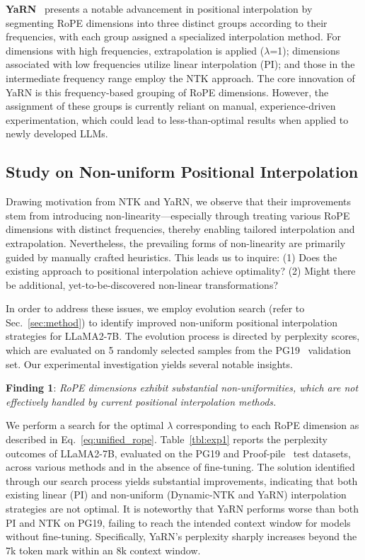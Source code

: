 \textbf{YaRN}~\cite{yarn} presents a notable advancement in positional interpolation by segmenting RoPE dimensions into three distinct groups according to their frequencies, with each group assigned a specialized interpolation method. For dimensions with high frequencies, extrapolation is applied ($\lambda$=1); dimensions associated with low frequencies utilize linear interpolation (PI); and those in the intermediate frequency range employ the NTK approach. The core innovation of YaRN is this frequency-based grouping of RoPE dimensions. However, the assignment of these groups is currently reliant on manual, experience-driven experimentation, which could lead to less-than-optimal results when applied to newly developed LLMs.

\subsection{Study on Non-uniform Positional Interpolation}

Drawing motivation from NTK and YaRN, we observe that their improvements stem from introducing non-linearity—especially through treating various RoPE dimensions with distinct frequencies, thereby enabling tailored interpolation and extrapolation. Nevertheless, the prevailing forms of non-linearity are primarily guided by manually crafted heuristics. This leads us to inquire: (1) Does the existing approach to positional interpolation achieve optimality? (2) Might there be additional, yet-to-be-discovered non-linear transformations?

In order to address these issues, we employ evolution search (refer to Sec.~\ref{sec:method}) to identify improved non-uniform positional interpolation strategies for LLaMA2-7B. The evolution process is directed by perplexity scores, which are evaluated on 5 randomly selected samples from the PG19~\cite{pg19} validation set. Our experimental investigation yields several notable insights.

\textbf{Finding 1}: \textit{RoPE dimensions exhibit substantial non-uniformities, which are not effectively handled by current positional interpolation methods.}

We perform a search for the optimal $\lambda$ corresponding to each RoPE dimension as described in Eq.~\ref{eq:unified_rope}. Table~\ref{tbl:exp1} reports the perplexity outcomes of LLaMA2-7B, evaluated on the PG19 and Proof-pile~\cite{proof-pile} test datasets, across various methods and in the absence of fine-tuning. The solution identified through our search process yields substantial improvements, indicating that both existing linear (PI) and non-uniform (Dynamic-NTK and YaRN) interpolation strategies are not optimal. It is noteworthy that YaRN performs worse than both PI and NTK on PG19, failing to reach the intended context window for models without fine-tuning. Specifically, YaRN’s perplexity sharply increases beyond the 7k token mark within an 8k context window.

